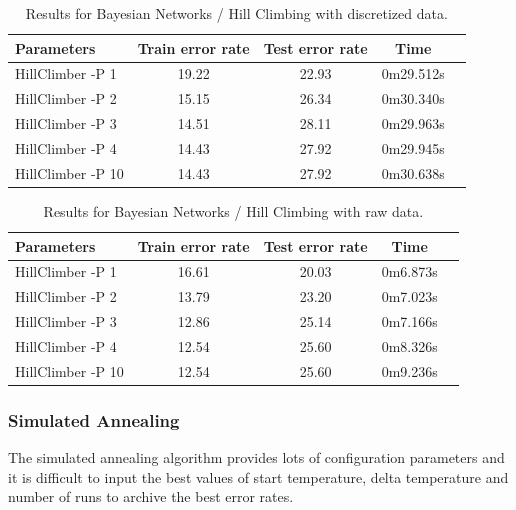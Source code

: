 \documentclass[a4paper]{llncs}
\begin{document}
\begin{table}[ht]
  \begin{center}
  \begin{tabular}{ | l | c | c | c | c |}
    \hline
    \textbf{Parameters} & \textbf{Train error rate} & \textbf{Test error rate} & \textbf{Time} \\ \hline
    HillClimber -P 1 & 19.22 & 22.93 & 0m29.512s \\ \hline
    HillClimber -P 2 & 15.15 & 26.34 & 0m30.340s \\ \hline
    HillClimber -P 3 & 14.51 & 28.11 & 0m29.963s \\ \hline
    HillClimber -P 4 & 14.43 & 27.92 & 0m29.945s \\ \hline
    HillClimber -P 10 & 14.43 & 27.92 & 0m30.638s \\ \hline
  \end{tabular}
  \caption{Results for Bayesian Networks / Hill Climbing with discretized data.}
  \label{tbl:results_bayesian_networks_hc_discr}
  \end{center}
\end{table}

\begin{table}[ht]
  \begin{center}
  \begin{tabular}{ | l | c | c | c | c |}
    \hline
    \textbf{Parameters} & \textbf{Train error rate} & \textbf{Test error rate} & \textbf{Time} \\ \hline
    HillClimber -P 1 & 16.61 & 20.03 & 0m6.873s \\ \hline
    HillClimber -P 2 & 13.79 & 23.20 & 0m7.023s \\ \hline
    HillClimber -P 3 & 12.86 & 25.14 & 0m7.166s \\ \hline
    HillClimber -P 4 & 12.54 & 25.60 & 0m8.326s \\ \hline
    HillClimber -P 10 & 12.54 & 25.60 & 0m9.236s \\ \hline
  \end{tabular}
  \caption{Results for Bayesian Networks / Hill Climbing with raw data.}
  \label{tbl:results_bayesian_networks_hc_raw}
  \end{center}
\end{table}

\subsubsection{Simulated Annealing}

The simulated annealing algorithm provides lots of configuration parameters
and it is difficult to input the best values of start temperature, delta
temperature and number of runs to archive the best error rates.
\end{document}
